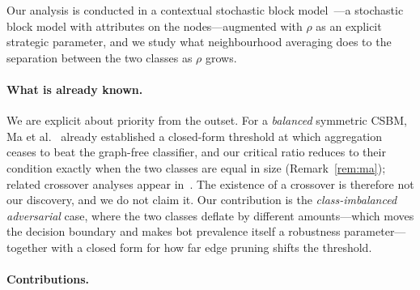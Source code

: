 \documentclass[../elsevier.tex]{subfiles}
\begin{document}
Our analysis is conducted in a contextual stochastic block
model~\citep{deshpande2018contextual}---a stochastic block model with attributes on
the nodes---augmented with $\rho$ as an explicit strategic parameter, and we study
what neighbourhood averaging does to the separation between the two classes as $\rho$
grows.

\paragraph{What is already known.} We are explicit about priority from the outset.
For a \emph{balanced} symmetric CSBM, Ma et al.~\citeyearpar[Thm.~2]{ma2022homophily}
already established a closed-form threshold at which aggregation ceases to beat the
graph-free classifier, and our critical ratio reduces to their condition exactly when
the two classes are equal in size (Remark~\ref{rem:ma}); related crossover analyses
appear in~\citep{luan2023when,mao2023demystifying,fountoulakis2023graph}. The
existence of a crossover is therefore not our discovery, and we do not claim it.
Our contribution is the \emph{class-imbalanced adversarial} case, where the two
classes deflate by different amounts---which moves the decision boundary and makes
bot prevalence itself a robustness parameter---together with a closed form for how
far edge pruning shifts the threshold.

\paragraph{Contributions.}
\end{document}
